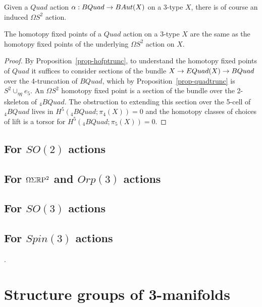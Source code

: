 \documentclass{amsart}
\begin{document}
Given a $Quad$ action $\alpha: BQuad \rightarrow BAut(X)$ on a 3-type $X$, there is of course an induced $\Omega S^2$ action.

\begin{proposition} \label{prop-quadvs2fp}
The homotopy fixed points of a $Quad$ action on a 3-type $X$ are the same as the homotopy fixed points of the underlying $\Omega S^2$ action on $X$.
\end{proposition}
\begin{proof}
By Proposition~\ref{prop-hofptrunc}, to understand the homotopy fixed points of $Quad$ it suffices to consider sections of the bundle $X \rightarrow EQuad(X) \rightarrow BQuad$ over the 4-truncation of $BQuad$, which by Proposition~\ref{prop-quadtrunc} is $S^2 \cup_{\eta q} e_5$.  An $\Omega S^2$ homotopy fixed point is a section of the bundle over the 2-skeleton of ${}_4 BQuad$.  The obstruction to extending this section over the 5-cell of ${}_4 BQuad$ lives in $H^5({}_4 BQuad;\pi_4(X)) = 0$ and the homotopy classes of choices of lift is a torsor for $H^5({}_4 BQuad;\pi_5(X)) = 0$.
\end{proof}


\subsection{For $SO(2)$ actions}


\subsection{For $\Omega \Sigma \mathbb R \mathrm{P}^2$ and $Orp(3)$ actions}


\subsection{For $SO(3)$ actions}

\subsection{For $Spin(3)$ actions} %
.
\appendix
\renewcommand{\thetheorem}{A.\arabic{theorem}}
\setcounter{theorem}{0}


\section{Structure groups of 3-manifolds} \label{sec-lft-struc}

\end{document}
